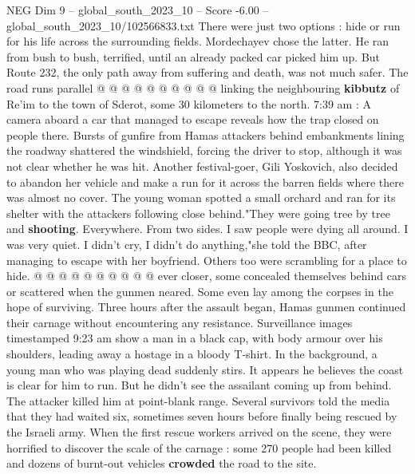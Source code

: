 \begin{textsample}{NEG Dim 9 – global\_south\_2023\_10 – Score -6.00 – global\_south\_2023\_10/102566833.txt}
There were just two options : hide or run for his life across the surrounding fields.
Mordechayev chose the latter.
He ran from bush to bush, terrified, until an already packed car picked him up.
But Route 232, the only path away from suffering and death, was not much safer.
The road runs parallel @ @ @ @ @ @ @ @ @ @ linking the neighbouring \textbf{kibbutz} of Re'im to the town of Sderot, some 30 kilometers to the north. 7:39 am : A camera aboard a car that managed to escape reveals how the trap closed on people there.
Bursts of gunfire from Hamas attackers behind embankments lining the roadway shattered the windshield, forcing the driver to stop, although it was not clear whether he was hit.
Another festival-goer, Gili Yoskovich, also decided to abandon her vehicle and make a run for it across the barren fields where there was almost no cover.
The young woman spotted a small orchard and ran for its shelter with the attackers following close behind."They were going tree by tree and \textbf{shooting}.
Everywhere.
From two sides.
I saw people were dying all around.
I was very quiet.
I didn't cry, I didn't do anything,"she told the BBC, after managing to escape with her boyfriend.
Others too were scrambling for a place to hide. @ @ @ @ @ @ @ @ @ @ ever closer, some concealed themselves behind cars or scattered when the gunmen neared.
Some even lay among the corpses in the hope of surviving.
Three hours after the assault began, Hamas gunmen continued their carnage without encountering any resistance.
Surveillance images timestamped 9:23 am show a man in a black cap, with body armour over his shoulders, leading away a hostage in a bloody T-shirt.
In the background, a young man who was playing dead suddenly stirs.
It appears he believes the coast is clear for him to run.
But he didn't see the assailant coming up from behind.
The attacker killed him at point-blank range.
Several survivors told the media that they had waited six, sometimes seven hours before finally being rescued by the Israeli army.
When the first rescue workers arrived on the scene, they were horrified to discover the scale of the carnage : some 270 people had been killed and dozens of burnt-out vehicles \textbf{crowded} the road to the site.

\end{textsample}
